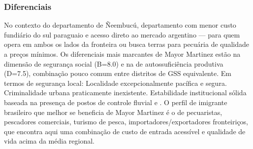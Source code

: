 \subsubsection*{Diferenciais}\label{dif-mayor-martinez-1210}
No contexto do departamento de Ñeembucú, departamento com menor custo fundiário do sul paraguaio e acesso direto ao mercado argentino — para quem opera em ambos os lados da fronteira ou busca terras para pecuária de qualidade a preços mínimos. Os diferenciais mais marcantes de Mayor Martinez estão na dimensão de segurança social (B=8.0) e na de autossuficiência produtiva (D=7.5), combinação pouco comum entre distritos de GSS equivalente. Em termos de segurança local: Localidade excepcionalmente pacífica e segura. Criminalidade urbana praticamente inexistente. Estabilidade institucional sólida baseada na presença de postos de controle fluvial e . O perfil de imigrante brasileiro que melhor se beneficia de Mayor Martinez é o de pecuaristas, pescadores comerciais, turismo de pesca, importadores/exportadores fronteiriços, que encontra aqui uma combinação de custo de entrada acessível e qualidade de vida acima da média regional.
